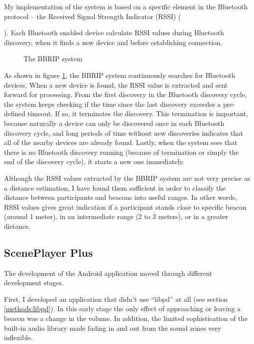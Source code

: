 \documentclass[a4paper,11pt]{article}
\begin{document}
My implementation of the system is based on a specific element in the Bluetooth protocol -- the Received Signal Strength Indicator (RSSI) ({\cite{bray12}).
Each Bluetooth enabled device calculate RSSI values during Bluetooth discovery, when it finds a new device and before establishing connection.

\begin{figure}[!htb]
	\centering
	\def\svgwidth{\columnwidth}
  	
	\caption{The BBRIP system}\label{fig:bbrip}
\end{figure}

As shown in figure \ref{fig:bbrip}, the BBRIP system continuously searches for Bluetooth devices.
When a new device is found, the RSSI value is extracted and sent forward for processing.
From the first discovery in the Bluetooth discovery cycle, the system keeps checking if the time since the last discovery exceedes a pre-defined timeout.
If so, it terminates the discovery.
This termination is important, because naturally a device can only be discovered once in each Bluetooth discovery cycle, and long periods of time without new discoveries indicates that all of the nearby devices are already found.
Lastly, when the system sees that there is no Bluetooth discovery running (because of termination or simply the end of the discovery cycle), it starts a new one immediately.

Although the RSSI values extracted by the BBRIP system are not very precise as a distance estimation, I have found them sufficient in order to classify the distance between participants and beacons into useful ranges.
In other words, RSSI values gives great indication if a participant stands close to specific beacon (around 1 meter), in an intermediate range (2 to 3 meters), or in a greater distance.

\subsection{ScenePlayer Plus}\label{sceneplayer_plus}

The development of the Android application moved through different development stages.

First, I developed an application that didn't use ``libpd'' at all (see section \ref{methods:libpd}).
In this early stage the only effect of approaching or leaving a beacon was a change in the volume.
In addition, the limited sophistication of the built-in audio library made fading in and out from the sound zones very inflexible.

}
\end{document}

